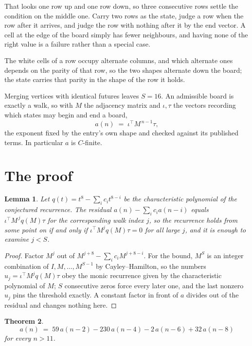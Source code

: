 \documentclass[11pt,a4paper]{article}
\theoremstyle{plain}
\newtheorem{theorem}{Theorem}
\newtheorem{lemma}[theorem]{Lemma}
\theoremstyle{definition}
\begin{document}
That looks one row up and one row down, so three consecutive rows settle the condition on the middle one. Carry two rows as the state, judge a row when the row after it arrives, and judge the row with nothing after it by the end vector. A cell at the edge of the board simply has fewer neighbours, and having none of the right value is a failure rather than a special case.

The white cells of a row occupy alternate columns, and which alternate ones depends on the parity of that row, so the two shapes alternate down the board; the state carries that parity in the shape of the row it holds.

Merging vertices with identical futures leaves $S=16$. An admissible board is exactly a walk, so with $M$ the adjacency matrix and $\iota,\tau$ the vectors recording which states may begin and end a board,
\[
a(n)\;=\;\iota^{\!\top}M^{\,n-1}\tau ,
\]
the exponent fixed by the entry's own shape and checked against its published terms. In
particular $a$ is $C$-finite.

\section{The proof}

\begin{lemma}\label{lem:crit}
Let $q(t)=t^{8}-\sum_i c_it^{8-i}$ be the characteristic polynomial of the
conjectured recurrence. The residual $a(n)-\sum_ic_ia(n-i)$ equals
$\iota^{\!\top}M^{\,j}q(M)\tau$ for the corresponding walk index $j$, so the recurrence
holds from some point on if and only if $\iota^{\!\top}M^{j}q(M)\tau=0$ for all large $j$,
and it is enough to examine $j<S$.
\end{lemma}

\begin{proof}
Factor $M^{j}$ out of $M^{j+8}-\sum_ic_iM^{j+8-i}$. For the bound, $M^{S}$
is an integer combination of $I,M,\dots,M^{S-1}$ by Cayley--Hamilton, so the numbers
$u_j=\iota^{\!\top}M^{j}q(M)\tau$ obey the monic recurrence given by the characteristic
polynomial of $M$; $S$ consecutive zeros force every later one, and the last nonzero $u_j$
pins the threshold exactly. A constant factor in front of $a$ divides out of the residual and
changes nothing here.
\end{proof}

\begin{theorem}
\[
a(n)\;=\;59\,a(n-2) - 230\,a(n-4) - 2\,a(n-6) + 32\,a(n-8)
\]
for every $n>11$.
\end{theorem}
\end{document}
